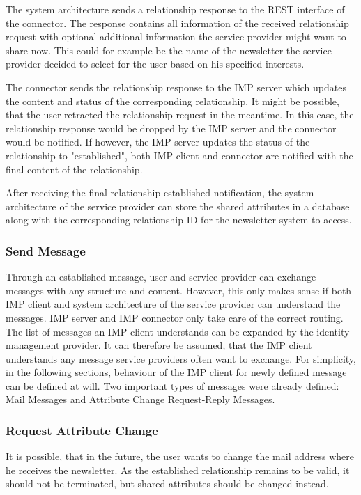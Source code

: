 The system architecture sends a relationship response to the REST interface of the connector. The response contains all information of the received relationship request with optional additional information the service provider might want to share now. This could for example be the name of the newsletter the service provider decided to select for the user based on his specified interests.

The connector sends the relationship response to the IMP server which updates the content and status of the corresponding relationship. It might be possible, that the user retracted the relationship request in the meantime. In this case, the relationship response would be dropped by the IMP server and the connector would be notified.
If however, the IMP server updates the status of the relationship to "established", both IMP client and connector are notified with the final content of the relationship.

After receiving the final relationship established notification, the system architecture of the service provider can store the shared attributes in a database along with the corresponding relationship ID for the newsletter system to access.

\subsubsection{Send Message}

Through an established message, user and service provider can exchange messages with any structure and content. However, this only makes sense if both IMP client and system architecture of the service provider can understand the messages. IMP server and IMP connector only take care of the correct routing. The list of messages an IMP client understands can be expanded by the identity management provider. It can therefore be assumed, that the IMP client understands any message service providers often want to exchange. For simplicity, in the following sections, behaviour of the IMP client for newly defined message can be defined at will. Two important types of messages were already defined: Mail Messages and Attribute Change Request-Reply Messages.

\subsubsection{Request Attribute Change}

It is possible, that in the future, the user wants to change the mail address where he receives the newsletter. As the established relationship remains to be valid, it should not be terminated, but shared attributes should be changed instead.

